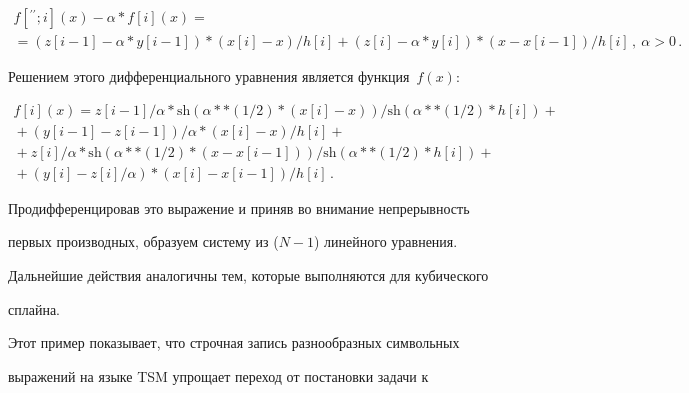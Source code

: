 \begin{multline*}


  f[^{\prime\prime}; i](x) - \alpha * f[i](x) ={}\\[3pt]


  {}= (z[i-1]-\alpha * y[i-1]) *


(x[i]-x)/h[i] + (z[i] -\alpha * y[i])* (x-x[i-1])/h[i]\,, \ \alpha>0\,.


\end{multline*}


  Решением этого дифференциального уравнения является функция~$f(x)$:


  


\noindent


  \begin{multline*}


  f[i](x)={z[i-1]}/\alpha * \mathrm{sh}(\alpha**(1/2)*(x[i] -x))/


  \mathrm{sh}(\alpha**(1/2)*h[i]) +{}\\


  {}+


 (y[i-1]-z[i-1])/\alpha *(x[i] - x)/h[i] +{}\\


 {}+ z[i]/\alpha *\mathrm{sh}(\alpha **(1/2)*(x - x[i-


1]))/\mathrm{sh}(\alpha **(1/2)*h[i]) +{}\\


{}+


(y[i] - z[i]/\alpha)*(x[i] - x[i-1])/h[i]\,.


  \end{multline*}


  Продифференцировав это выражение и приняв во внимание непрерывность


первых производных, образуем систему из ($N-1$) линейного уравнения.


Дальнейшие действия аналогичны тем, которые выполняются для кубического


\mbox{сплайна}.


{ %





}





  Этот пример показывает, что строчная запись разнообразных символьных


выражений на языке TSM упрощает переход от постановки задачи к


